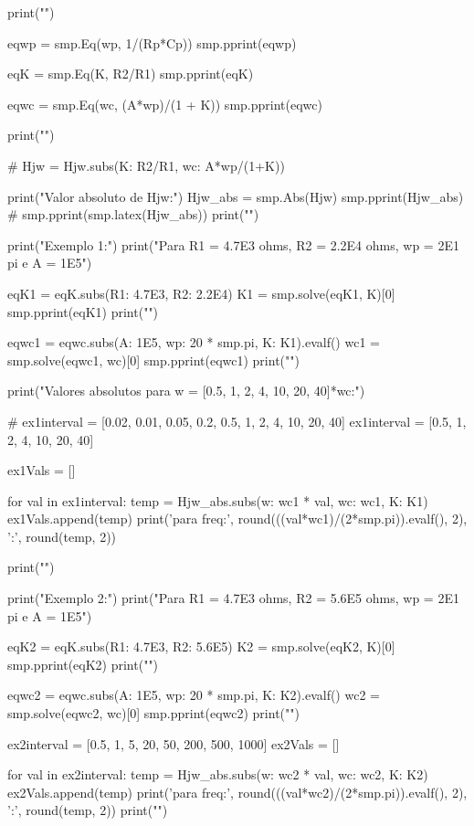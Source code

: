 \begin{python}
    print("")

    eqwp = smp.Eq(wp, 1/(Rp*Cp))
    smp.pprint(eqwp)

    eqK = smp.Eq(K, R2/R1)
    smp.pprint(eqK)

    eqwc = smp.Eq(wc, (A*wp)/(1 + K))
    smp.pprint(eqwc)

    print("")

    # Hjw = Hjw.subs({K: R2/R1, wc: A*wp/(1+K)})

    print("Valor absoluto de Hjw:")
    Hjw_abs = smp.Abs(Hjw)
    smp.pprint(Hjw_abs)
    # smp.pprint(smp.latex(Hjw_abs))
    print("")


    print("Exemplo 1:")
    print("Para R1 = 4.7E3 ohms, R2 = 2.2E4 ohms, wp = 2E1 pi e A = 1E5\n")

    eqK1 = eqK.subs({R1: 4.7E3, R2: 2.2E4})
    K1 = smp.solve(eqK1, K)[0]
    smp.pprint(eqK1)
    print("")

    eqwc1 = eqwc.subs({A: 1E5, wp: 20 * smp.pi, K: K1}).evalf()
    wc1 = smp.solve(eqwc1, wc)[0]
    smp.pprint(eqwc1)
    print("")

    print("Valores absolutos para w = [0.5, 1, 2, 4, 10, 20, 40]*wc:")

    # ex1interval = [0.02, 0.01, 0.05, 0.2, 0.5, 1, 2, 4, 10, 20, 40]
    ex1interval = [0.5, 1, 2, 4, 10, 20, 40]

    ex1Vals = []

    for val in ex1interval:
    temp = Hjw_abs.subs({w: wc1 * val, wc: wc1, K: K1})
    ex1Vals.append(temp)
    print('para freq:', round(((val*wc1)/(2*smp.pi)).evalf(), 2),
    '\ttemos:', round(temp, 2))

    print("")

    print("Exemplo 2:")
    print("Para R1 = 4.7E3 ohms, R2 = 5.6E5 ohms, wp = 2E1 pi e A = 1E5\n")

    eqK2 = eqK.subs({R1: 4.7E3, R2: 5.6E5})
    K2 = smp.solve(eqK2, K)[0]
    smp.pprint(eqK2)
    print("")

    eqwc2 = eqwc.subs({A: 1E5, wp: 20 * smp.pi, K: K2}).evalf()
    wc2 = smp.solve(eqwc2, wc)[0]
    smp.pprint(eqwc2)
    print("")

    ex2interval = [0.5, 1, 5, 20, 50, 200, 500, 1000]
    ex2Vals = []

    for val in ex2interval:
    temp = Hjw_abs.subs({w: wc2 * val, wc: wc2, K: K2})
    ex2Vals.append(temp)
    print('para freq:', round(((val*wc2)/(2*smp.pi)).evalf(), 2),
    '\ttemos:', round(temp, 2))
    print("")



\end{python}
